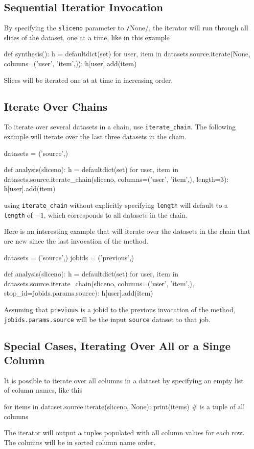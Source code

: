 \subsection*{Sequential Iteratior Invocation}
By specifying the \texttt{sliceno} parameter to
\texttt/None/, the iterator will run through all slices of
the dataset, one at a time, like in this example
\begin{python}
def synthesis():
    h = defaultdict(set)
    for user, item in datasets.source.iterate(None, columns=('user', 'item',)):
        h[user].add(item)
\end{python}
Slices will be iterated one at at time in increasing order.

\subsection*{Iterate Over Chains}
To iterate over several datasets in a chain, use
\texttt{iterate\_chain}.  The following example will iterate over the
last three datasets in the chain.
\begin{python}
datasets = ('source',)

def analysis(sliceno):
    h = defaultdict(set)
    for user, item in datasets.source.iterate_chain(sliceno, columns=('user', 'item',), length=3):
        h[user].add(item)
\end{python}
using \texttt{iterate\_chain} without explicitly specifying
\texttt{length} will default to a \texttt{length} of $-1$, which
corresponds to all datasets in the chain.

Here is an interesting example that will iterate over the datasets in
the chain that are new since the last invocation of the method.
\begin{python}
datasets = ('source',)
jobids = ('previous',)

def analysis(sliceno):
    h = defaultdict(set)
    for user, item in datasets.source.iterate_chain(sliceno, columns=('user', 'item',), stop_id=jobids.params.source):
        h[user].add(item)
\end{python}
  Assuming that \texttt{previous} is a jobid to
the previous invocation of the method, \texttt{jobids.params.source}
will be the input \texttt{source} dataset to that job.  



\subsection*{Special Cases, Iterating Over All or a Singe Column}
It is possible to iterate over all columns in a dataset by specifying
an empty list of column names, like this
\begin{python}
for items in dataset.source.iterate(sliceno, None):
    print(items)  # is a tuple of all columns
\end{python}
The iterator will output a tuples populated with all column values for
each row.  The columns will be in sorted column name order.

